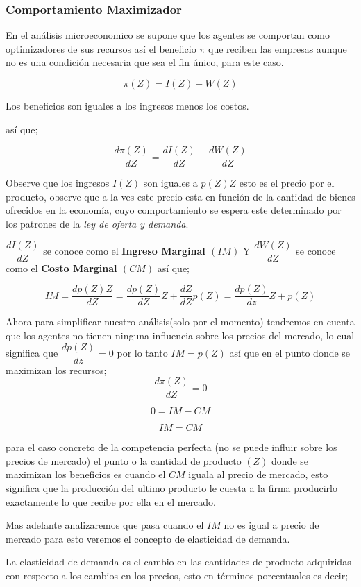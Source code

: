 \documentclass[12pt]{article}
\begin{document}
\subsubsection*{Comportamiento Maximizador}

En el análisis microeconomico se supone que los agentes se comportan como optimizadores de sus recursos así el beneficio $\pi$ que reciben las empresas aunque no es una condición necesaria que sea el fin único, para este caso.


$$\pi(Z)=I(Z)-W(Z)$$

Los beneficios son iguales a los ingresos menos los costos.

así que;

$$\dfrac{ d \pi(Z)}{dZ} = \dfrac{dI(Z)}{dZ}- \dfrac{dW(Z)}{dZ}$$

Observe que los ingresos $I(Z)$ son iguales a $p(Z)Z$ esto es el precio por el producto, observe que a la ves este precio esta en función  de la cantidad de bienes ofrecidos en la economía, cuyo comportamiento se espera este determinado por los patrones de la \textit{ley de oferta y demanda}.

$\dfrac{dI(Z)}{dZ}$ se conoce como el \textbf{Ingreso Marginal $(IM)$} Y $\dfrac{dW(Z)}{dZ}$ se conoce como el \textbf{Costo Marginal $(CM)$} así que;


$$IM = \dfrac{dp(Z)Z}{dZ} = \dfrac{dp(Z)}{dZ}Z + \dfrac{dZ}{dZ}p(Z)= \dfrac{dp(Z)}{dz}Z+p(Z)$$


Ahora para simplificar nuestro análisis(solo por el momento) tendremos en cuenta que los agentes no tienen ninguna influencia sobre los precios del mercado, lo cual significa que $\dfrac{dp(Z)}{dz}=0$
por lo tanto $IM=p(Z)$ así que en el punto donde se maximizan los recursos; $$\dfrac{d\pi(Z)}{dZ}=0$$ 

$$0= IM-CM$$

$$IM=CM$$

para el caso concreto de la competencia perfecta (no se puede influir sobre los precios de mercado) el punto o la cantidad de producto $(Z)$ donde se maximizan los beneficios es cuando el $CM$ iguala al precio de mercado, esto significa que la producción del ultimo producto le cuesta a la firma producirlo exactamente lo que recibe por ella en el mercado. 

Mas adelante analizaremos que pasa cuando el $IM$ no es igual a precio de mercado para esto veremos el concepto de elasticidad de demanda.


La elasticidad de demanda es el cambio en las cantidades de producto adquiridas con respecto a los cambios en los precios, esto en términos porcentuales es decir;
\end{document}
